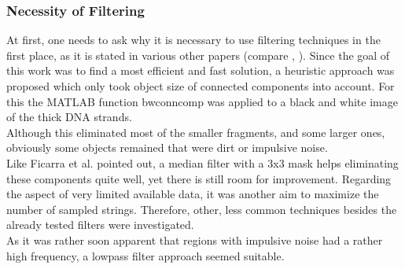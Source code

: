 \documentclass{article}
\begin{document}
\subsubsection{Necessity of Filtering}
At first, one needs to ask why it is necessary to use filtering techniques in the first place, as it is stated in various other papers (compare \cite{ficarra2005automated}, \cite{ficarra2005automated}). Since the goal of this work was to find a most efficient and fast solution, a heuristic approach was proposed which only took object size of connected components into account. For this the MATLAB function bwconncomp was applied to a black and white image of the thick DNA strands.\\
Although this eliminated most of the smaller fragments, and some larger ones, obviously some objects remained that were dirt or impulsive noise. \\
Like Ficarra et al. \cite{ficarra2005automated} pointed out, a median filter with a 3x3 mask helps eliminating these components quite well, yet there is still room for improvement. Regarding the aspect of very limited available data, it was another aim to maximize the number of sampled strings. Therefore, other, less common techniques besides the already tested filters were investigated.\\
As it was rather soon apparent that regions with impulsive noise had a rather high frequency, a lowpass filter approach seemed suitable.
\end{document}
